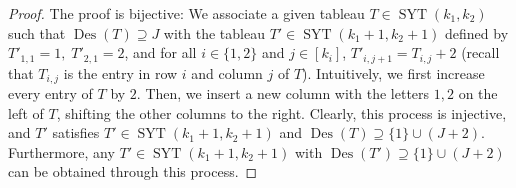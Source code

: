\documentclass[11pt]{article}
\theoremstyle{definition}
\numberwithin{equation}{section}
\newcommand{\Des}{\operatorname{Des}}
\newcommand{\Syt}{\operatorname{SYT}}
\begin{document}
\begin{proof}
    The proof is bijective: We associate a given tableau $T \in \Syt(k_1, k_2)$ such that $\Des(T) \supseteq J$ with the tableau $T' \in \Syt(k_1+1, k_2+1)$ defined by $T'_{1,1} = 1,\; T'_{2,1} = 2$, and for all $i \in \{1,2\}$ and $j \in [k_i]$, $T'_{i,j+1} = T_{i,j}+2$ (recall that $T_{i,j}$ is the entry in row $i$ and column $j$ of $T$). Intuitively, we first increase every entry of $T$ by $2$. Then, we insert a new column with the letters $1,2$ on the left of $T$, shifting the other columns to the right. Clearly, this process is injective, and $T'$ satisfies $T' \in \Syt(k_1+1, k_2+1)$ and $\Des(T) \supseteq \{1\}\cup (J+2)$. Furthermore, any $T' \in \Syt(k_1+1, k_2+1)$ with $\Des(T') \supseteq \{1\}\cup (J+2)$ can be obtained through this process.
\end{proof}
\end{document}
